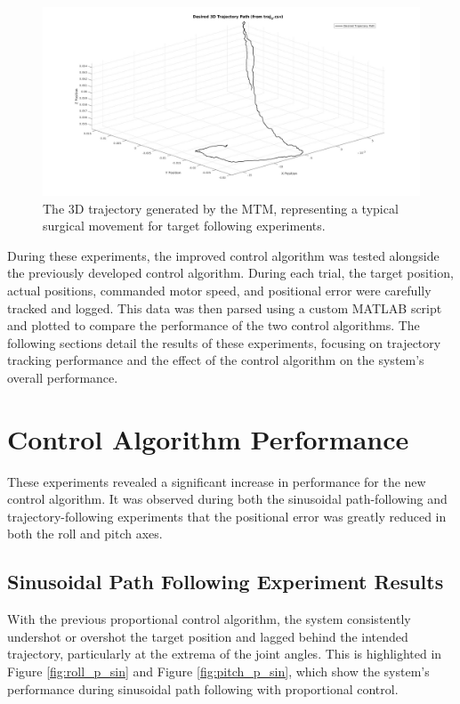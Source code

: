 \begin{figure}[h!]
    \centering
    \includegraphics[width=1.0\linewidth]{figures/desired_trajectory.jpg}
    \caption{The 3D trajectory generated by the MTM, representing a typical surgical movement for target following experiments.}
    \label{fig:desired_trajectory}
\end{figure}

During these experiments, the improved control algorithm was tested alongside the previously developed control algorithm. During each trial, the target position, actual positions, commanded motor speed, and positional error were carefully tracked and logged. This data was then parsed using a custom MATLAB script and plotted to compare the performance of the two control algorithms. The following sections detail the results of these experiments, focusing on trajectory tracking performance and the effect of the control algorithm on the system's overall performance.

\section{Control Algorithm Performance}
\label{section:trajectory_performance}

These experiments revealed a significant increase in performance for the new control algorithm. It was observed during both the sinusoidal path-following and trajectory-following experiments that the positional error was greatly reduced in both the roll and pitch axes. 

\subsection{Sinusoidal Path Following Experiment Results}

With the previous proportional control algorithm, the system consistently undershot or overshot the target position and lagged behind the intended trajectory, particularly at the extrema of the joint angles. This is highlighted in Figure \ref{fig:roll_p_sin} and Figure \ref{fig:pitch_p_sin}, which show the system's performance during sinusoidal path following with proportional control.

